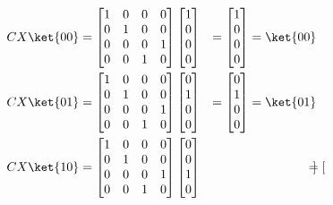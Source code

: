 \begin{equation*}
  \begin{aligned}
    CX \ket{00} & = \begin{bmatrix}
      1 & 0 & 0 & 0 \\
      0 & 1 & 0 & 0 \\
      0 & 0 & 0 & 1 \\
      0 & 0 & 1 & 0
      \end{bmatrix} \begin{bmatrix}
      1 \\ 0 \\ 0 \\ 0
      \end{bmatrix} & = \begin{bmatrix}
      1 \\ 0 \\ 0 \\ 0
    \end{bmatrix} = \ket{00} \\
    CX \ket{01} & = \begin{bmatrix}
      1 & 0 & 0 & 0 \\
      0 & 1 & 0 & 0 \\
      0 & 0 & 0 & 1 \\
      0 & 0 & 1 & 0
      \end{bmatrix} \begin{bmatrix}
      0 \\ 1 \\ 0 \\ 0
      \end{bmatrix} & = \begin{bmatrix}
      0 \\ 1 \\ 0 \\ 0
    \end{bmatrix} = \ket{01} \\
    CX \ket{10} & = \begin{bmatrix}
      1 & 0 & 0 & 0 \\
      0 & 1 & 0 & 0 \\
      0 & 0 & 0 & 1 \\
      0 & 0 & 1 & 0
      \end{bmatrix} \begin{bmatrix}
      0 \\ 0 \\ 1 \\ 0
      \end{bmatrix} & = \begin{bmatrix}

\end{bmatrix}
\end{aligned}
\end{equation*}
